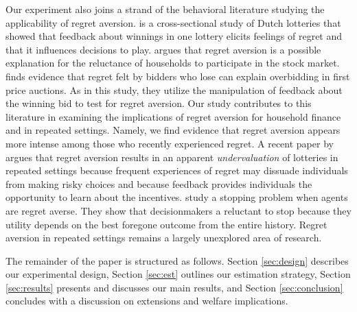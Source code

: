 \documentclass[12pt]{article}
\begin{document}
	Our experiment also joins a strand of the behavioral literature studying the applicability of regret aversion. \textcite{zeelenberg_consequences_2004} is a cross-sectional study of Dutch lotteries that showed that feedback about winnings in one lottery elicits feelings of regret and that it influences decisions to play. \textcite{barberis_individual_2006} argues that regret aversion is a possible explanation for the reluctance of households to participate in the stock market. \textcite{filiz-ozbay_auctions_2007} finds evidence that regret felt by bidders who lose can explain overbidding in first price auctions. As in this study, they utilize the manipulation of feedback about the winning bid to test for regret aversion. Our study contributes to this literature in examining the implications of regret aversion for household finance and in repeated settings. Namely, we find evidence that regret aversion appears more intense among those who recently experienced regret. A recent paper by \textcite{imas_regret_2016} argues that regret aversion results in an apparent \emph{undervaluation} of lotteries in repeated settings because frequent experiences of regret may dissuade individuals from making risky choices and because feedback provides individuals the opportunity to learn about the incentives. \textcite{strack_too_2019} study a stopping problem when agents are regret averse. They show that decisionmakers a reluctant to stop because they utility depends on the best foregone outcome from the entire history. Regret aversion in repeated settings remains a largely unexplored area of research.

	The remainder of the paper is structured as follows. Section \ref{sec:design} describes our experimental design, Section \ref{sec:est} outlines our estimation strategy, Section \ref{sec:results} presents and discusses our main results, and Section \ref{sec:conclusion} concludes with a discussion on extensions and welfare implications.

\end{document}
